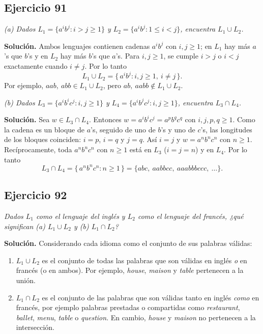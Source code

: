 \subsection*{Ejercicio 91}

\noindent\textit{(a) Dados $L_1 = \{a^i b^j : i > j \geq 1\}$ y
    $L_2 = \{a^i b^j : 1 \leq i < j\}$, encuentra $L_1 \cup L_2$.}

\medskip
\noindent\textbf{Solución.} Ambos lenguajes contienen cadenas $a^i b^j$ con
$i, j \geq 1$; en $L_1$ hay más $a$'s que $b$'s y en $L_2$ hay más $b$'s que $a$'s.
Para $i, j \geq 1$, se cumple $i > j$ o $i < j$ exactamente cuando $i \neq j$. Por lo
tanto
\[
L_1 \cup L_2 = \{\, a^i b^j : i, j \geq 1,\ i \neq j \,\}.
\]
Por ejemplo, $aab,\ abb \in L_1 \cup L_2$, pero $ab,\ aabb \notin L_1 \cup L_2$.

\medskip
\noindent\textit{(b) Dados $L_3 = \{a^i b^i c^j : i, j \geq 1\}$ y
    $L_4 = \{a^i b^j c^j : i, j \geq 1\}$, encuentra $L_3 \cap L_4$.}

\medskip
\noindent\textbf{Solución.} Sea $w \in L_3 \cap L_4$. Entonces
$w = a^i b^i c^j = a^p b^q c^q$ con $i, j, p, q \geq 1$. Como la cadena es un bloque
de $a$'s, seguido de uno de $b$'s y uno de $c$'s, las longitudes de los bloques
coinciden: $i = p$, $i = q$ y $j = q$. Así $i = j$ y $w = a^n b^n c^n$ con
$n \geq 1$. Recíprocamente, toda $a^n b^n c^n$ con $n \geq 1$ está en $L_3$
($i = j = n$) y en $L_4$. Por lo tanto
\[
L_3 \cap L_4 = \{\, a^n b^n c^n : n \geq 1 \,\} = \{abc,\ aabbcc,\ aaabbbccc,\ \dots\}.
\]

\subsection*{Ejercicio 92}

\noindent\textit{Dados $L_1$ como el lenguaje del inglés y $L_2$ como el lenguaje del
    francés, ¿qué significan (a) $L_1 \cup L_2$ y (b) $L_1 \cap L_2$?}

\medskip
\noindent\textbf{Solución.} Considerando cada idioma como el conjunto de sus
palabras válidas:
\begin{enumerate}
    \item[(a)] $L_1 \cup L_2$ es el conjunto de todas las palabras que son válidas en
    inglés \emph{o} en francés (o en ambos). Por ejemplo, \textit{house},
    \textit{maison} y \textit{table} pertenecen a la unión.
    \item[(b)] $L_1 \cap L_2$ es el conjunto de las palabras que son válidas tanto en
    inglés \emph{como} en francés, por ejemplo palabras prestadas o
    compartidas como \textit{restaurant}, \textit{ballet}, \textit{menu},
    \textit{table} o \textit{question}. En cambio, \textit{house} y
    \textit{maison} no pertenecen a la intersección.
\end{enumerate}

